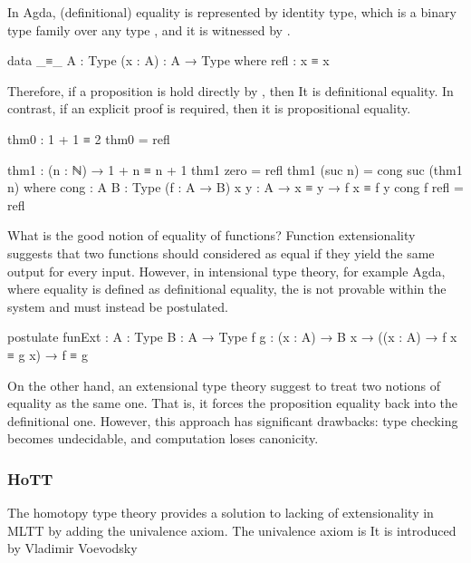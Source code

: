 In Agda, (definitional) equality is represented by identity type, which is a binary type family over any type , and it is witnessed by .

\begin{code}
data _≡_ {A : Type} (x : A) : A → Type where
  refl : x ≡ x
\end{code}

Therefore, if a proposition is hold directly by , then It is definitional equality. In contrast, if an explicit proof is required, then it is propositional equality.

\begin{code}
thm0 : 1 + 1 ≡ 2
thm0 = refl

thm1 : (n : ℕ) → 1 + n ≡ n + 1
thm1 zero = refl
thm1 (suc n) = cong suc (thm1 n)
  where
  cong : {A B : Type} (f : A → B) {x y : A} → x ≡ y → f x ≡ f y
  cong f refl = refl
\end{code}

What is the good notion of equality of functions? Function extensionality suggests that two functions should considered as equal if they yield the same output for every input. However, in intensional type theory, for example Agda, where equality is defined as definitional equality, the  is not provable within the system and must instead be postulated.

\begin{code}
postulate
  funExt : {A : Type} {B : A → Type} {f g : (x : A) → B x} →
           ((x : A) → f x ≡ g x) → f ≡ g
\end{code}

On the other hand, an extensional type theory suggest to treat two notions of equality as the same one. That is, it forces the proposition equality back into the definitional one. However, this approach has significant drawbacks: type checking becomes undecidable, and computation loses canonicity.

\subsubsection*{HoTT}

The homotopy type theory provides a solution to lacking of extensionality in MLTT by adding the univalence axiom. The univalence axiom is It is introduced by Vladimir Voevodsky